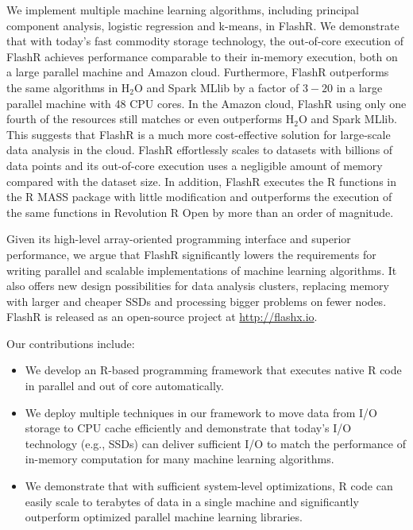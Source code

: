 
We implement multiple machine learning algorithms, including principal component
analysis, logistic regression and k-means, in FlashR. We demonstrate that
with today's fast commodity storage technology, the out-of-core execution of
FlashR achieves performance comparable to their in-memory execution, both
on a large parallel machine and Amazon cloud. Furthermore, FlashR outperforms
the same algorithms in H$_2$O \cite{h2o} and Spark MLlib \cite{spark} by a factor
of $3-20$ in a large parallel machine with 48 CPU cores. In the Amazon cloud,
FlashR using only one fourth of the resources still matches or even outperforms
H$_2$O and Spark MLlib. This suggests that FlashR is a much
more cost-effective solution for large-scale data analysis in the cloud.
FlashR effortlessly scales to datasets with billions
of data points and its out-of-core execution uses a negligible amount of memory
compared with the dataset size. In addition, FlashR executes the R functions
in the R MASS \cite{mass} package with little modification and outperforms
the execution of the same functions in Revolution R Open \cite{rro} by more
than an order of magnitude.

Given its high-level array-oriented programming interface and superior performance,
we argue that FlashR significantly lowers the requirements for writing
parallel and scalable implementations of machine learning algorithms. It also
offers new design possibilities for data analysis clusters, replacing memory
with larger and cheaper SSDs and processing bigger problems on fewer nodes.
FlashR is released as an open-source project at \href{http://flashx.io}{http://flashx.io}.

Our contributions include:
\begin{itemize}
\item We develop an R-based programming framework that executes native R code
in parallel and out of core automatically.
\item We deploy multiple techniques in our framework to move data from
I/O storage to CPU cache efficiently and demonstrate that today's I/O
technology (e.g., SSDs) can deliver sufficient I/O to match the performance of
in-memory computation for many machine learning algorithms.
\item We demonstrate that with sufficient system-level optimizations, R code
can easily scale to terabytes of data in a single machine and significantly
outperform optimized parallel machine learning libraries.
\end{itemize}

